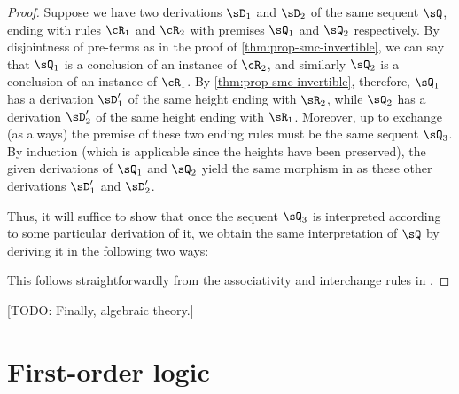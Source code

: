 \documentclass{book}
\begin{document}
\begin{proof}
  Suppose we have two derivations $\sD_1$ and $\sD_2$ of the same sequent $\sQ$, ending with rules $\cR_1$ and $\cR_2$ with premises $\sQ_1$ and $\sQ_2$ respectively.
  By disjointness of pre-terms as in the proof of \cref{thm:prop-smc-invertible}, we can say that $\sQ_1$ is a conclusion of an instance of $\cR_2$, and similarly $\sQ_2$ is a conclusion of an instance of $\cR_1$.
  By \cref{thm:prop-smc-invertible}, therefore, $\sQ_1$ has a derivation $\sD_1'$ of the same height ending with $\sR_2$, while $\sQ_2$ has a derivation $\sD_2'$ of the same height ending with $\sR_1$.
  Moreover, up to exchange (as always) the premise of these two ending rules must be the same sequent $\sQ_3$.
  By induction (which is applicable since the heights have been preserved), the given derivations of $\sQ_1$ and $\sQ_2$ yield the same morphism in \cM as these other derivations $\sD_1'$ and $\sD_2'$.

  Thus, it will suffice to show that once the sequent $\sQ_3$ is interpreted according to some particular derivation of it, we obtain the same interpretation of $\sQ$ by deriving it in the following two ways:
  This follows straightforwardly from the associativity and interchange rules in \cM.
\end{proof}

[TODO: Finally, algebraic theory.]




\chapter{First-order logic}
\label{chap:fol}






\end{document}
